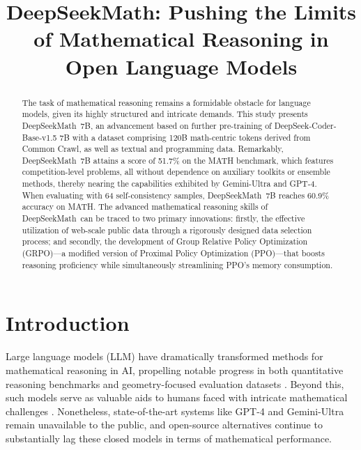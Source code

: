\title{DeepSeekMath: Pushing the Limits of Mathematical Reasoning in Open Language Models}

\begin{abstract}
The task of mathematical reasoning remains a formidable obstacle for language models, given its highly structured and intricate demands. This study presents DeepSeekMath~7B, an advancement based on further pre-training of DeepSeek-Coder-Base-v1.5 7B with a dataset comprising 120B math-centric tokens derived from Common Crawl, as well as textual and programming data. Remarkably, DeepSeekMath~7B attains a score of 51.7\% on the MATH benchmark, which features competition-level problems, all without dependence on auxiliary toolkits or ensemble methods, thereby nearing the capabilities exhibited by Gemini-Ultra and GPT-4. When evaluating with 64 self-consistency samples, DeepSeekMath~7B reaches 60.9\% accuracy on MATH. The advanced mathematical reasoning skills of DeepSeekMath~can be traced to two primary innovations: firstly, the effective utilization of web-scale public data through a rigorously designed data selection process; and secondly, the development of Group Relative Policy Optimization (GRPO)—a modified version of Proximal Policy Optimization (PPO)—that boosts reasoning proficiency while simultaneously streamlining PPO's memory consumption.
\end{abstract}

\section{Introduction}

Large language models (LLM) have dramatically transformed methods for mathematical reasoning in AI, propelling notable progress in both quantitative reasoning benchmarks \citep{MATH} and geometry-focused evaluation datasets \citep{trinh2024solving}. Beyond this, such models serve as valuable aids to humans faced with intricate mathematical challenges \citep{tao}. Nonetheless, state-of-the-art systems like GPT-4 \citep{gpt4} and Gemini-Ultra \citep{gemini} remain unavailable to the public, and open-source alternatives continue to substantially lag these closed models in terms of mathematical performance.

